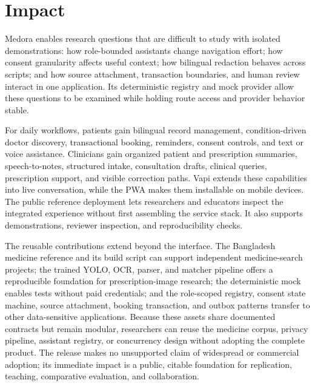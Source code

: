 \documentclass[preprint,12pt,a4paper]{elsarticle}
\begin{document}
\section{Impact}

Medora enables research questions that are difficult to study with isolated demonstrations:
how role-bounded assistants change navigation effort; how consent granularity affects useful
context; how bilingual redaction behaves across scripts; and how source attachment,
transaction boundaries, and human review interact in one application. Its deterministic
registry and mock provider allow these questions to be examined while holding route access
and provider behavior stable.

For daily workflows, patients gain bilingual record management, condition-driven doctor
discovery, transactional booking, reminders, consent controls, and text or voice assistance.
Clinicians gain organized patient and prescription summaries, speech-to-notes, structured
intake, consultation drafts, clinical queries, prescription support, and visible correction
paths. Vapi extends these capabilities into live conversation, while the PWA makes them
installable on mobile devices. The public reference deployment lets researchers and
educators inspect the integrated experience without first assembling the service stack.
It also supports demonstrations, reviewer inspection, and reproducibility checks.

The reusable contributions extend beyond the interface. The Bangladesh medicine reference
and its build script can support independent medicine-search projects; the trained YOLO,
OCR, parser, and matcher pipeline offers a reproducible foundation for prescription-image
research; the deterministic mock enables tests without paid credentials; and the
role-scoped registry, consent state machine, source attachment, booking transaction, and
outbox patterns transfer to other data-sensitive applications. Because these assets share
documented contracts but remain modular, researchers can reuse the medicine corpus, privacy
pipeline, assistant registry, or concurrency design without adopting the complete product.
The release makes no unsupported claim of widespread or commercial adoption; its immediate
impact is a public, citable foundation for replication, teaching, comparative evaluation,
and collaboration.
\end{document}
